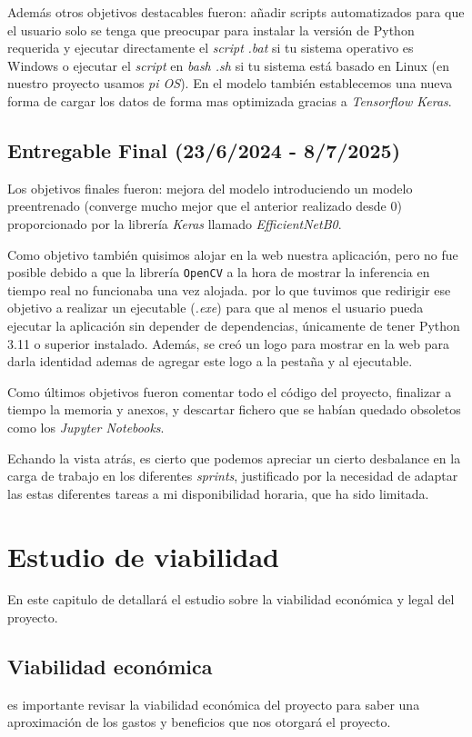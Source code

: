 Además otros objetivos destacables fueron: añadir scripts automatizados para que el usuario solo se tenga que preocupar para instalar la versión de Python requerida y ejecutar directamente el \textit{script} \textit{.bat} si tu sistema operativo es Windows o ejecutar el \textit{script} en \textit{bash .sh} si tu sistema está basado en Linux (en nuestro proyecto usamos \textit{pi OS}). En el modelo también establecemos una nueva forma de cargar los datos de forma mas optimizada gracias a \textit{Tensorflow Keras}.


\subsection{Entregable Final (23/6/2024 - 8/7/2025)}
Los objetivos finales fueron: mejora del modelo introduciendo un modelo preentrenado (converge mucho mejor que el anterior realizado desde 0) proporcionado por la librería \textit{Keras} llamado \textit{EfficientNetB0}.

Como objetivo también quisimos alojar en la web nuestra aplicación, pero no fue posible debido a que la librería \texttt{OpenCV} a la hora de mostrar la inferencia en tiempo real no funcionaba una vez alojada. por lo que tuvimos que redirigir ese objetivo a realizar un ejecutable (\textit{.exe}) para que al menos el usuario pueda ejecutar la aplicación sin depender de dependencias, únicamente de tener Python 3.11 o superior instalado. Además, se creó un logo para mostrar en la web para darla identidad ademas de agregar este logo a la pestaña y al ejecutable.

Como últimos objetivos fueron comentar todo el código del proyecto, finalizar a tiempo la memoria y anexos, y descartar fichero que se habían quedado obsoletos como los \textit{Jupyter Notebooks}.



Echando la vista atrás, es cierto que podemos apreciar un cierto desbalance en la carga de trabajo en los diferentes \textit{sprints},  justificado por la necesidad de adaptar las estas diferentes tareas a mi disponibilidad horaria, que ha sido limitada.


\section{Estudio de viabilidad}
En este capitulo de detallará el estudio sobre la viabilidad económica y legal del proyecto.

\subsection{Viabilidad económica}
es importante revisar la viabilidad económica del proyecto para saber una aproximación de los gastos y beneficios que nos otorgará el proyecto. 

